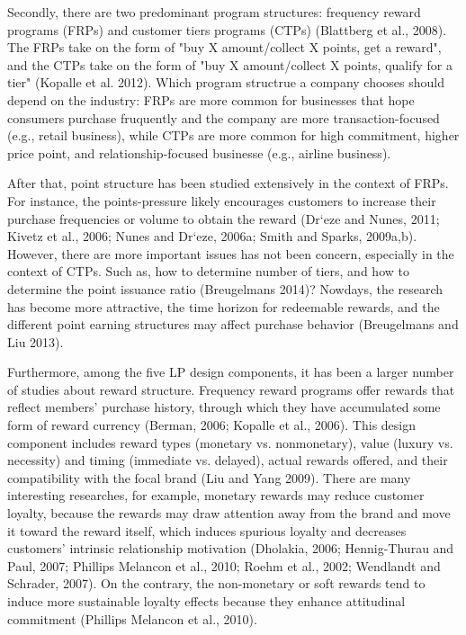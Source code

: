 \documentclass[12pt]{article}
\begin{document}
\begin{spacing}{1.5}
Secondly, there are two predominant program structures: frequency reward programs (FRPs) and customer tiers programs (CTPs) (Blattberg et al., 2008)\cite{blattberg2008byung}. The FRPs take on the form of "buy X amount/collect X points, get a reward", and the CTPs take on the form of "buy X amount/collect X points, qualify for a tier" (Kopalle et al. 2012)\cite{kopalle2012joint}. Which program structrue a company chooses should depend on the industry: FRPs are more common for businesses that hope consumers purchase fruquently and the company are more transaction-focused (e.g., retail business), while CTPs are more common for high commitment, higher price point, and relationship-focused businesse (e.g., airline business).

After that, point structure has been studied extensively in the context of FRPs. For instance, the points-pressure likely encourages customers to increase their purchase frequencies or volume to obtain the reward (Dr`eze and Nunes, 2011; Kivetz et al., 2006; Nunes and Dr`eze, 2006a; Smith and Sparks, 2009a,b)\cite{dreze2008feeling}\cite{kivetz2006goal}\cite{nunes2006endowed}\cite{smith2009s}\cite{smith2009reward}. However, there are more important issues has not been concern, especially in the context of CTPs. Such as, how to determine number of tiers, and how to determine the point issuance ratio (Breugelmans 2014)\cite{breugelmans2015advancing}? Nowdays, the research has become more attractive, the time horizon for redeemable rewards, and the different point earning structures may affect purchase behavior (Breugelmans and Liu 2013)\cite{breugelmans2017effect}.

Furthermore, among the five LP design components, it has been a larger number of studies about reward structure. Frequency reward programs offer rewards that reflect members’ purchase history, through which they have accumulated some form of reward currency (Berman, 2006; Kopalle et al., 2006)\cite{berman2006developing}\cite{kopalle2009dynamic}. This design component includes reward types (monetary vs. nonmonetary), value (luxury vs. necessity) and timing (immediate vs. delayed), actual rewards offered, and their compatibility with the focal brand (Liu and Yang 2009)\cite{liu2009competing}. There are many interesting researches, for example, monetary rewards may reduce customer loyalty, because the rewards may draw attention away from the brand and move it toward the reward itself, which induces spurious loyalty and decreases customers’ intrinsic relationship motivation (Dholakia, 2006; Hennig-Thurau and Paul, 2007; Phillips Melancon et al., 2010; Roehm et al., 2002; Wendlandt and Schrader, 2007)\cite{dholakia2006customer}\cite{hennig2007can}\cite{melancon2011managing}\cite{roehm2002designing}\cite{wendlandt2007consumer}. On the contrary, the non-monetary or soft rewards tend to induce more sustainable loyalty effects because they enhance attitudinal commitment (Phillips Melancon et al., 2010)\cite{melancon2011managing}.


\end{spacing}
\end{document}
